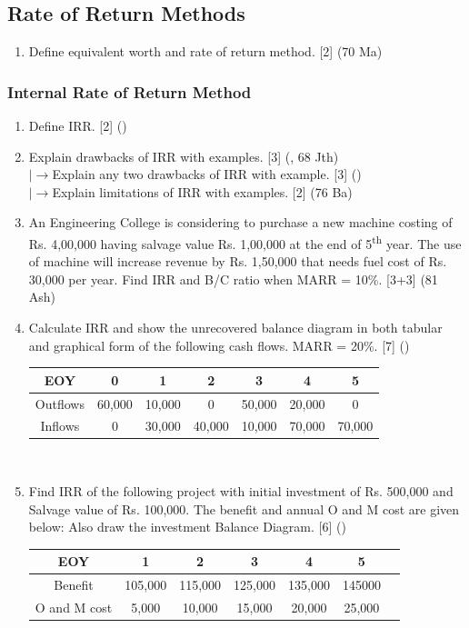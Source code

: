 \documentclass[12pt]{article}
\newcommand{\lb}{\\ $\left|\rightarrow\right.$}
\newcommand{\super}[1]{\textsuperscript{#1}}
\begin{document}
	\subsection{Rate of Return Methods}
	\begin{enumerate} [noitemsep, topsep = 0pt]
		\item Define equivalent worth and rate of return method. \hfill [2] (70 Ma)
	\end{enumerate}
	\subsubsection{Internal Rate of Return Method}
	\begin{enumerate}[noitemsep, topsep = 0pt]
		\item Define IRR. \hfill [2] ()
		
		\item Explain drawbacks of IRR with examples. \hfill [3] (, 68 Jth)
		\lb  Explain any two drawbacks of IRR with example. \hfill [3] ()
		\lb  Explain limitations of IRR with examples. \hfill [2] (76 Ba)	
		
		\item An Engineering College is considering to purchase a new machine costing of Rs. 4,00,000 having salvage value Rs. 1,00,000 at the end of 5\super{th} year. The use of machine will increase revenue by Rs. 1,50,000 that needs fuel cost of Rs. 30,000 per year. Find IRR and B/C ratio when MARR = 10\%. \hfill [3+3] (81 Ash)
		
		\item Calculate IRR and show the unrecovered balance diagram in both tabular and graphical form of the following cash flows. MARR = 20\%. \hfill [7] ()
		\begin{tabular}{|c|c|c|c|c|c|c|}
			\hline
			EOY & 0 & 1 & 2 & 3 & 4 & 5\\ \hline
			Outflows & 60,000 & 10,000 & 0 & 50,000 & 20,000 & 0\\ \hline
			Inflows & 0 & 30,000 & 40,000 & 10,000 & 70,000 & 70,000\\ \hline
		\end{tabular}\\[1pt]
		
		\item Find IRR of the following project with initial investment of Rs. 500,000 and Salvage value of Rs. 100,000. The benefit and annual O and M cost are given below: Also draw the investment Balance Diagram. \hfill [6] ()\\
		\begin{tabular}{|c|c|c|c|c|c|c|}
			\hline
			EOY & 1 & 2 & 3 & 4 & 5\\ \hline
			Benefit & 105,000 & 115,000 & 125,000 & 135,000 & 145000 \\ \hline
			O and M cost & 5,000 & 10,000 & 15,000 & 20,000 & 25,000 \\ \hline
		\end{tabular}\\[1pt]
		

\end{enumerate}
\end{document}
